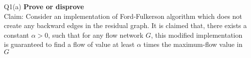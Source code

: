 \begin{problem}
  {Q1(a)}
  \textbf{Prove or disprove} \\
  Claim: Consider an implementation of Ford-Fulkerson algorithm which does not create any backward edges in the residual graph. It is claimed that, there exists a constant $\alpha > 0$, such
  that for any flow network $G$, this modified implementation is guaranteed to find a flow of value at least $\alpha$ times the maximum-flow value in $G$
\end{problem}
